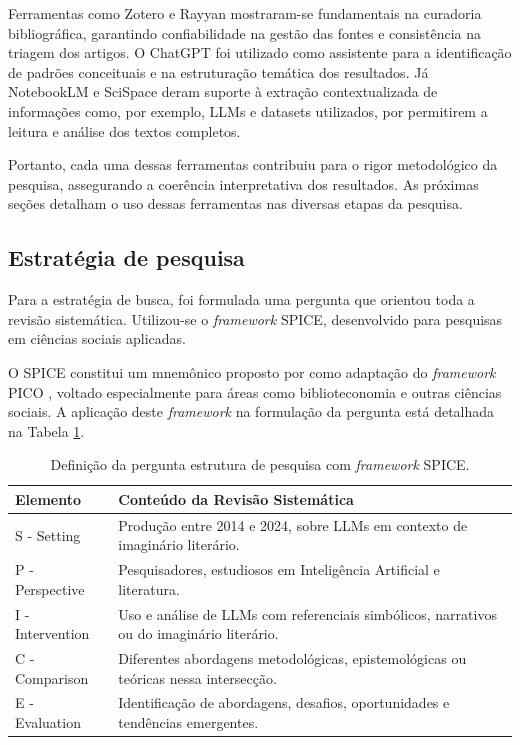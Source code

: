 \documentclass[portuguese]{textolivre}
\begin{document}
Ferramentas como Zotero e Rayyan mostraram-se fundamentais na curadoria bibliográfica, garantindo confiabilidade na gestão das fontes e consistência na triagem dos artigos. O ChatGPT foi utilizado como assistente para a identificação de padrões conceituais e na estruturação temática dos resultados. Já NotebookLM e SciSpace deram suporte à extração contextualizada de informações como, por exemplo, LLMs e datasets utilizados, por permitirem a leitura e análise dos textos completos.

Portanto, cada uma dessas ferramentas contribuiu para o rigor metodológico da pesquisa, assegurando a coerência interpretativa dos resultados. As próximas seções detalham o uso dessas ferramentas nas diversas etapas da pesquisa.

\subsection{Estratégia de pesquisa}
Para a estratégia de busca, foi formulada uma pergunta que orientou toda a revisão sistemática. Utilizou-se o \textit{framework} SPICE, desenvolvido para pesquisas em ciências sociais aplicadas.

O SPICE constitui um mnemônico proposto por \textcite{booth2006} como adaptação do \textit{framework} PICO \cite{crumley2002}, voltado especialmente para áreas como biblioteconomia e outras ciências sociais. A aplicação deste \textit{framework} na formulação da pergunta está detalhada na Tabela \ref{tab-1}.

\begin{table}[ht!]
\centering
\begin{threeparttable}
\caption{Definição da pergunta estrutura de pesquisa com \textit{framework} SPICE.}\label{tab-1}
\begin{tabularx}{\textwidth}{l X}
\toprule
Elemento & Conteúdo da Revisão Sistemática \\
\midrule
S - Setting & Produção entre 2014 e 2024, sobre LLMs em contexto de imaginário literário. \\
P - Perspective & Pesquisadores, estudiosos em Inteligência Artificial e literatura. \\
I - Intervention & Uso e análise de LLMs com referenciais simbólicos, narrativos ou do imaginário literário. \\
C - Comparison & Diferentes abordagens metodológicas, epistemológicas ou teóricas nessa intersecção. \\
E - Evaluation & Identificação de abordagens, desafios, oportunidades e tendências emergentes. \\
\bottomrule
\end{tabularx}
\end{threeparttable}
\end{table}
\end{document}
